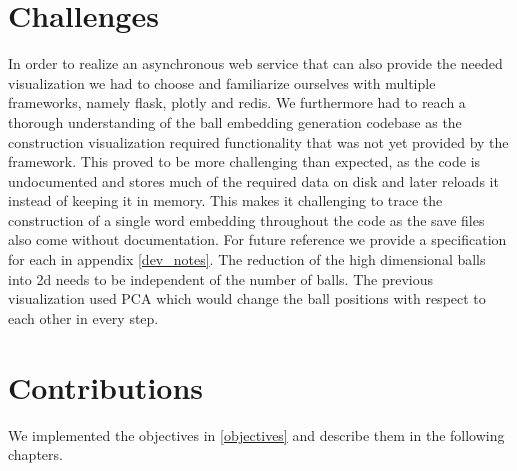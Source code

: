 \section{Challenges}
In order to realize an asynchronous web service that can also provide the needed visualization we had to choose and familiarize ourselves with multiple frameworks, namely flask, plotly and redis.
We furthermore had to reach a thorough understanding of the ball embedding generation codebase as the construction visualization required functionality that was not yet provided by the framework.
This proved to be more challenging than expected, as the code is undocumented and stores much of the required data on disk and later reloads it instead of keeping it in memory. This makes it challenging to trace the construction of a single word embedding throughout the code as the save files also come without documentation. For future reference we provide a specification for each in appendix \ref{dev_notes}.
The reduction of the high dimensional balls into 2d needs to be independent of the number of balls. The previous visualization used PCA which would change the ball positions with respect to each other in every step.

\section{Contributions}
We implemented the objectives in \ref{objectives} and describe them in the following chapters.